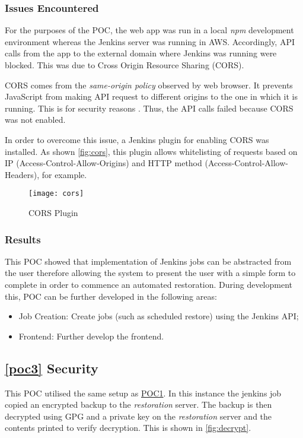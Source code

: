 	\subsubsection{Issues Encountered}
	For the purposes of the POC, the web app was run in a local \textit{npm} development environment whereas the Jenkins server was running in AWS. Accordingly, API calls from the app to the external domain where Jenkins was running were blocked. This was due to Cross Origin Resource Sharing (CORS). 
	
	CORS comes from the \textit{same-origin policy} observed by web browser.  It prevents JavaScript from making API request to different origins to the one in which it is running. This is for security reasons \citep{mozilla}. Thus, the API calls failed because CORS was not enabled. 
	
	In order to overcome this issue, a Jenkins plugin for enabling CORS was installed. As shown \autoref{fig:cors}, this plugin allows whitelisting of requests based on IP (Access-Control-Allow-Origins) and HTTP method (Access-Control-Allow-Headers), for example. 
	\begin{figure}[H]
		\caption{CORS Plugin}
		\centering
		\texttt{[image: cors]}
		\label{fig:cors}
	\end{figure}
		
	
	\subsubsection{Results}
	This POC showed that implementation of Jenkins jobs can be abstracted from the user therefore allowing the system to present the user with a simple form to complete in order to commence an automated restoration. During development this, POC can be further developed in the following areas:
	\begin{itemize}
		\item Job Creation: Create jobs (such as scheduled restore) using the Jenkins API;
		\item Frontend: Further develop the frontend. 
	\end{itemize}
	
	\subsection{\ref{poc3} Security}
	This POC utilised the same setup as \hyperref[poc1]{POC1}. In this instance the jenkins job copied an encrypted backup to the \textit{restoration} server. The backup is then decrypted using GPG and a private key on the \textit{restoration} server and the contents printed to verify decryption. This is shown in \autoref{fig:decrypt}.
	

